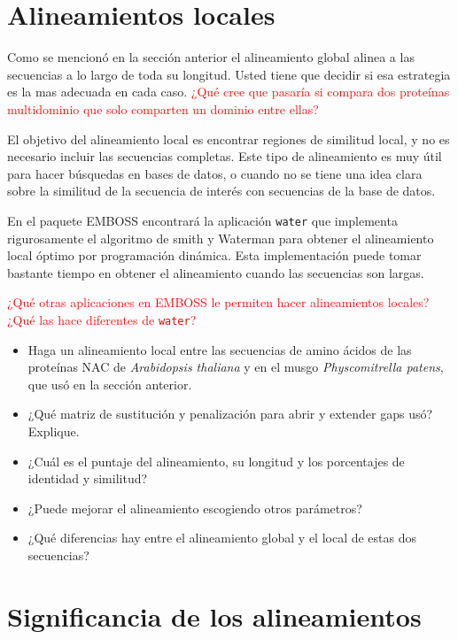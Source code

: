 \documentclass[letter,11pt]{book}
\begin{document}
\section{Alineamientos locales}

Como se mencionó en la sección anterior el alineamiento global alinea a las secuencias a lo largo de toda su longitud. Usted tiene que decidir si esa estrategia es la mas adecuada en cada caso. \textcolor{red}{¿Qué cree que pasaría si compara dos proteínas multidominio que solo comparten un dominio entre ellas?}

El objetivo del alineamiento local es encontrar regiones de similitud local, y no es necesario incluir las secuencias completas. Este tipo de alineamiento es muy útil para hacer búsquedas en bases de datos, o cuando no se tiene una idea clara sobre la similitud de la secuencia de interés con secuencias de la base de datos.

En el paquete EMBOSS encontrará la aplicación \Verb+water+ que implementa rigurosamente el algoritmo de  smith y Waterman \citep{Smith1981} para obtener el alineamiento local óptimo por programación dinámica. Esta implementación puede tomar bastante tiempo en obtener el alineamiento cuando las secuencias son largas.

\textcolor{red}{¿Qué otras aplicaciones en EMBOSS le permiten hacer alineamientos locales? ¿Qué las hace diferentes de \Verb+water+?}

{\color{red}
\begin{itemize}
\item Haga un alineamiento local entre las secuencias de amino ácidos de las proteínas NAC de \textit{Arabidopsis thaliana} y en el musgo \textit{Physcomitrella patens}, que usó en la sección anterior.
\item ¿Qué matriz de sustitución y penalización para abrir y extender gaps usó? Explique.
\item ¿Cuál es el puntaje del alineamiento, su longitud y los porcentajes de identidad y similitud?
\item ¿Puede mejorar el alineamiento escogiendo otros parámetros?
\item ¿Qué diferencias hay entre el alineamiento global y el local de estas dos secuencias?
\end{itemize}
}

\section{Significancia de los alineamientos}
\end{document}
